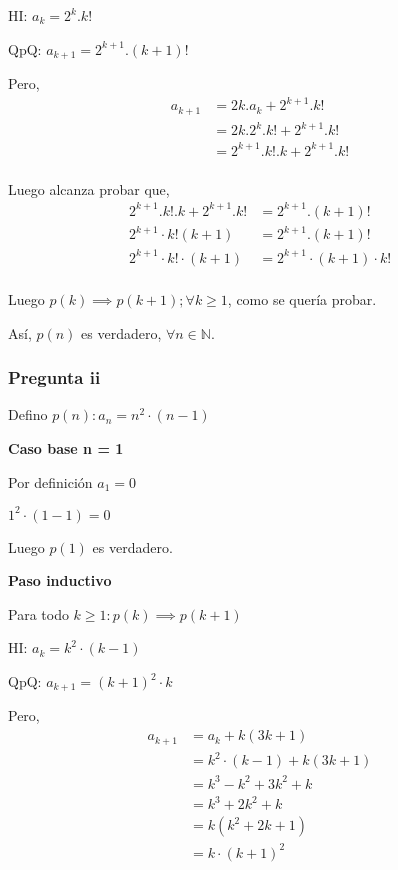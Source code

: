HI: $ a_k = 2^k.k!$

QpQ: $ a_{k+1} = 2^{k+1}.(k+1)!$

Pero,
\begin{align*}
    a_{k+1} &= 2k . a_k + 2^{k+1}.k! \\
    &= 2k . 2^k.k! + 2^{k+1}.k! \\
    &= 2^{k+1}.k!.k + 2^{k+1}.k! \\
\end{align*}

Luego alcanza probar que,
\begin{align*}
    2^{k+1}.k!.k + 2^{k+1}.k! &= 2^{k+1}.(k+1)! \\
    2^{k+1}\cdot k!(k+1) &= 2^{k+1}.(k+1)! \\
    2^{k+1}\cdot k!\cdot (k+1) &= 2^{k+1}\cdot (k+1)\cdot k! \\
\end{align*}

Luego $p(k) \implies p(k+1); \forall k \geq 1$, como se quería probar.

Así, $p(n)$ es verdadero, $\forall n \in \mathbb{N}$.

\subsubsection{Pregunta ii}

Defino $ p(n): a_n = n^2\cdot (n-1) $

\textbf{Caso base n = 1}

Por definición $a_1 = 0$

$ 1^2\cdot (1-1) = 0 $

Luego $ p(1) $ es verdadero.

\textbf{Paso inductivo}

Para todo $k \geq 1: p(k) \implies p(k+1)$

HI: $ a_k = k^2\cdot (k-1)$

QpQ: $ a_{k+1} = (k+1)^2\cdot k$

Pero,
\begin{align*}
    a_{k+1} &= a_k + k(3k+1) \\
    &= k^2\cdot (k-1) + k(3k+1) \\
    &= k^3 - k^2 + 3k^2+k \\
    &= k^3 +2k^2+k \\
    &= k(k^2 + 2k + 1)\\
    &= k\cdot (k+1)^2\\
\end{align*}

